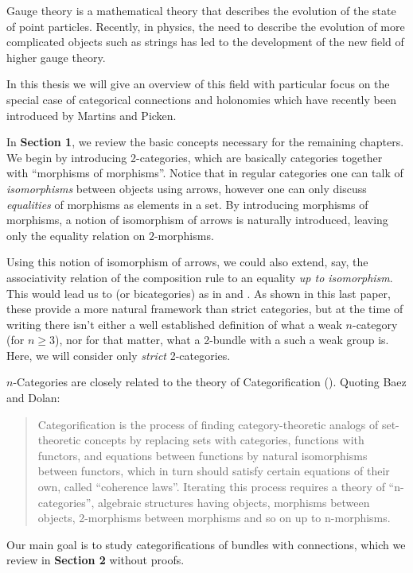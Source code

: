 
Gauge theory is a mathematical theory that describes the evolution of the state of point particles. Recently, in physics, the need to describe the evolution of more complicated objects such as strings has led to the development of the new field of higher gauge theory.

In this thesis we will give an overview of this field with particular focus on the special case of categorical connections and holonomies which have recently been introduced by Martins and Picken.

In \textbf{Section 1}, we review the basic concepts necessary for the remaining chapters. We begin by introducing 2-categories, which are basically categories together with ``morphisms of morphisms''. Notice that in regular categories one can talk of \emph{isomorphisms} between objects using arrows, however one can only discuss \emph{equalities} of morphisms as elements in a set. By introducing morphisms of morphisms, a notion of isomorphism of arrows is naturally introduced, leaving only the equality relation on $2$-morphisms.

Using this notion of isomorphism of arrows, we could also extend, say, the associativity relation of the composition rule to an equality \emph{up to isomorphism}. This would lead us to  (or bicategories) as in \cite{maclane} and \cite{ncatsbaez}. As shown in this last paper, these provide a more natural framework than strict categories, but at the time of writing there isn't either a well established definition of what a weak $n$-category (for $n\geq 3$), nor for that matter, what a 2-bundle with a such a weak group is. Here, we will consider only \emph{strict} 2-categories.

$n$-Categories are closely related to the theory of Categorification (\cite{categorification}). Quoting  Baez and Dolan:
\begin{quote}
 Categorification is the process of finding category-theoretic analogs
of set-theoretic concepts by replacing sets with categories, functions with functors, and equations between functions by natural isomorphisms between functors, which in turn should satisfy certain equations of their own, called ``coherence laws''. Iterating this process requires a theory of ``n-categories'', algebraic structures having objects, morphisms between objects, 2-morphisms between morphisms and so on up to n-morphisms.
\end{quote}

Our main goal is to study categorifications of bundles with connections, which we review in \textbf{Section 2} without proofs.


